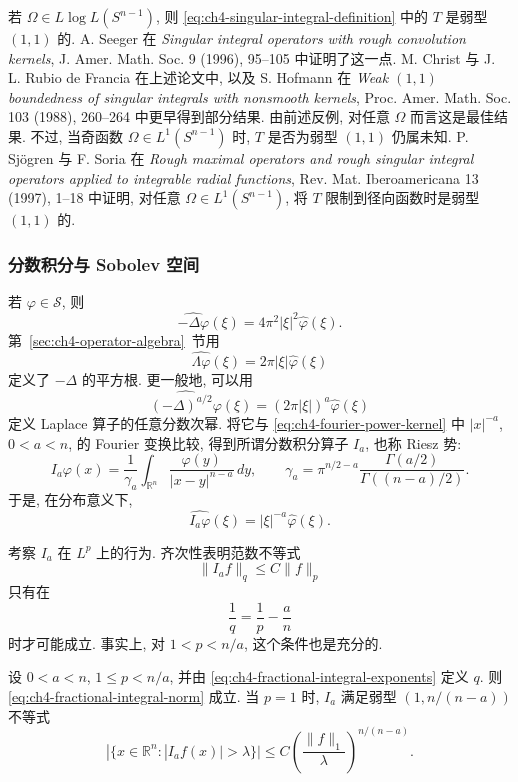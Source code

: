 若 $\Omega\in L\log L(S^{n-1})$, 则 \eqref{eq:ch4-singular-integral-definition} 中的 $T$ 是弱型 $(1,1)$ 的. A. Seeger 在 \emph{Singular integral operators with rough convolution kernels}, J. Amer. Math. Soc. 9 (1996), 95--105 中证明了这一点. M. Christ 与 J. L. Rubio de Francia 在上述论文中, 以及 S. Hofmann 在 \emph{Weak $(1,1)$ boundedness of singular integrals with nonsmooth kernels}, Proc. Amer. Math. Soc. 103 (1988), 260--264 中更早得到部分结果. 由前述反例, 对任意 $\Omega$ 而言这是最佳结果. 不过, 当奇函数 $\Omega\in L^1(S^{n-1})$ 时, $T$ 是否为弱型 $(1,1)$ 仍属未知. P. Sjögren 与 F. Soria 在 \emph{Rough maximal operators and rough singular integral operators applied to integrable radial functions}, Rev. Mat. Iberoamericana 13 (1997), 1--18 中证明, 对任意 $\Omega\in L^1(S^{n-1})$, 将 $T$ 限制到径向函数时是弱型 $(1,1)$ 的.

\subsubsection{分数积分与 Sobolev 空间}
\label{subsec:ch4-fractional-integrals-sobolev}

若 $\varphi\in\mathcal S$, 则
\[
 \widehat{-\Delta\varphi}(\xi)=4\pi^2|\xi|^2\widehat\varphi(\xi).
\]
第~\ref{sec:ch4-operator-algebra}~节用
\[
 \widehat{\Lambda\varphi}(\xi)=2\pi|\xi|\widehat\varphi(\xi)
\]
定义了 $-\Delta$ 的平方根. 更一般地, 可以用
\[
 \widehat{(-\Delta)^{a/2}\varphi}(\xi)
 =(2\pi|\xi|)^a\widehat\varphi(\xi)
\]
定义 Laplace 算子的任意分数次幂. 将它与 \eqref{eq:ch4-fourier-power-kernel} 中 $|x|^{-a}$, $0<a<n$, 的 Fourier 变换比较, 得到所谓分数积分算子 $I_a$, 也称 Riesz 势:
\[
 I_a\varphi(x)=\frac1{\gamma_a}\int_{\mathbb R^n}
 \frac{\varphi(y)}{|x-y|^{n-a}}\,dy,
 \qquad
 \gamma_a=\pi^{n/2-a}
 \frac{\Gamma(a/2)}{\Gamma((n-a)/2)}.
\]
于是, 在分布意义下,
\[
 \widehat{I_a\varphi}(\xi)=|\xi|^{-a}\widehat\varphi(\xi).
\]

\hypertarget{chapter-04-page-101}{}
考察 $I_a$ 在 $L^p$ 上的行为. 齐次性表明范数不等式
\begin{equation}
\label{eq:ch4-fractional-integral-norm}
 \|I_af\|_q\le C\|f\|_p
\end{equation}
只有在
\begin{equation}
\label{eq:ch4-fractional-integral-exponents}
 \frac1q=\frac1p-\frac an
\end{equation}
时才可能成立. 事实上, 对 $1<p<n/a$, 这个条件也是充分的.

\begin{Theorem}
\label{thm:ch4-hardy-littlewood-sobolev}
设 $0<a<n$, $1\le p<n/a$, 并由 \eqref{eq:ch4-fractional-integral-exponents} 定义 $q$. 则 \eqref{eq:ch4-fractional-integral-norm} 成立. 当 $p=1$ 时, $I_a$ 满足弱型 $(1,n/(n-a))$ 不等式
\[
 |\{x\in\mathbb R^n:|I_af(x)|>\lambda\}|
 \le C\left(\frac{\|f\|_1}{\lambda}\right)^{n/(n-a)}.
\]
\end{Theorem}

